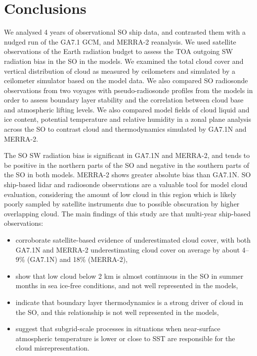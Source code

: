 \section{Conclusions}

We analysed 4 years of observational SO ship data, and contrasted them with a
nudged run of the GA7.1 GCM, and MERRA-2 reanalysis. We used satellite
observations of the Earth radiation budget to assess the TOA outgoing SW
radiation bias in the SO in the models. We examined the total cloud cover and
vertical distribution of cloud as measured by ceilometers and simulated by a
ceilometer simulator based on the model data. We also compared SO radiosonde
observations from two voyages with pseudo-radiosonde profiles from the models in
order to assess boundary layer stability and the correlation between cloud base
and atmospheric lifting levels. We also compared model fields of cloud liquid
and ice content, potential temperature and relative humidity in a zonal plane
analysis across the SO to contrast cloud and thermodynamics simulated
by GA7.1N and MERRA-2.

The SO SW radiation bias is significant in GA7.1N and MERRA-2, and tends to be
positive in the northern parts of the SO and negative in the southern parts of
the SO in both models. MERRA-2 shows greater absolute bias than GA7.1N. SO
ship-based lidar and radiosonde observations are a valuable tool for model cloud
evaluation, considering the amount of low cloud in this region which is likely
poorly sampled by satellite instruments due to possible obscuration by higher
overlapping cloud. The main findings of this study are that multi-year
ship-based observations:

\begin{itemize}
\item corroborate satellite-based evidence of underestimated cloud cover, with
both GA7.1N and MERRA-2 underestimating cloud cover on average by about 4--9\%
(GA7.1N) and 18\% (MERRA-2),
\item show that low cloud below 2 \unit{km} is almost continuous in the SO in
summer months in sea ice-free conditions, and not well represented in the
models,
\item indicate that boundary layer thermodynamics is a strong driver of cloud in
the SO, and this relationship is not well represented in the models,
\item suggest that subgrid-scale processes in situations when near-surface
atmospheric temperature is lower or close to SST are responsible for the cloud
misrepresentation.
\end{itemize}

